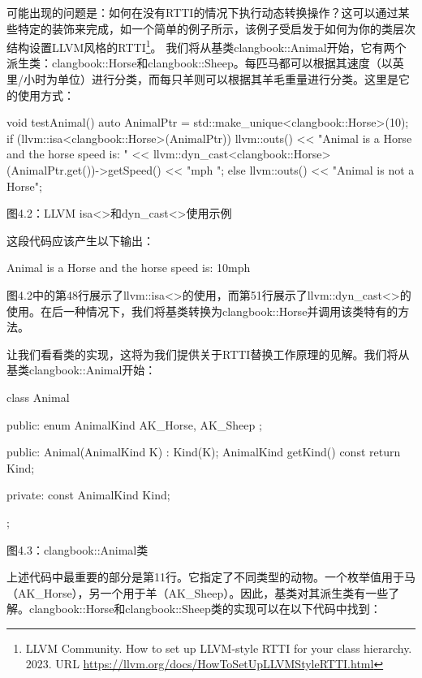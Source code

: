可能出现的问题是：如何在没有RTTI的情况下执行动态转换操作？这可以通过某些特定的装饰来完成，如一个简单的例子所示，该例子受启发于如何为你的类层次结构设置LLVM风格的RTTI\footnote{LLVM Community. How to set up LLVM-style RTTI for your class hierarchy. 2023. URL \url{https://llvm.org/docs/HowToSetUpLLVMStyleRTTI.html}}。 我们将从基类clangbook::Animal开始，它有两个派生类：clangbook::Horse和clangbook::Sheep。每匹马都可以根据其速度（以英里/小时为单位）进行分类，而每只羊则可以根据其羊毛重量进行分类。这里是它的使用方式：

\begin{cpp}
void testAnimal() {
  auto AnimalPtr = std::make_unique<clangbook::Horse>(10);
  if (llvm::isa<clangbook::Horse>(AnimalPtr)) {
    llvm::outs()
      << "Animal is a Horse and the horse speed is: "
      << llvm::dyn_cast<clangbook::Horse>(AnimalPtr.get())->getSpeed()
      << "mph \n";
  } else {
    llvm::outs() << "Animal is not a Horse\n";
  }
}
\end{cpp}

\begin{center}
图4.2：LLVM isa<>和dyn\_cast<>使用示例
\end{center}

这段代码应该产生以下输出：

\begin{shell}
Animal is a Horse and the horse speed is: 10mph
\end{shell}

图4.2中的第48行展示了llvm::isa<>的使用，而第51行展示了llvm::dyn\_cast<>的使用。在后一种情况下，我们将基类转换为clangbook::Horse并调用该类特有的方法。

让我们看看类的实现，这将为我们提供关于RTTI替换工作原理的见解。我们将从基类clangbook::Animal开始：

\begin{cpp}
class Animal {
public:
  enum AnimalKind { AK_Horse, AK_Sheep };

public:
  Animal(AnimalKind K) : Kind(K){};
  AnimalKind getKind() const { return Kind; }

private:
  const AnimalKind Kind;
};
\end{cpp}

\begin{center}
图4.3：clangbook::Animal类
\end{center}

上述代码中最重要的部分是第11行。它指定了不同类型的动物。一个枚举值用于马（AK\_Horse），另一个用于羊（AK\_Sheep）。因此，基类对其派生类有一些了解。clangbook::Horse和clangbook::Sheep类的实现可以在以下代码中找到：

